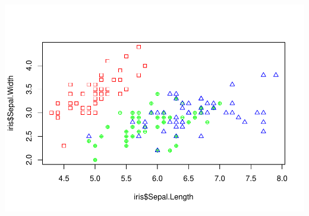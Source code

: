 \documentclass[
]{book}
\begin{document}
\includegraphics{_main_files/figure-latex/unnamed-chunk-190-1.pdf}
\end{document}
